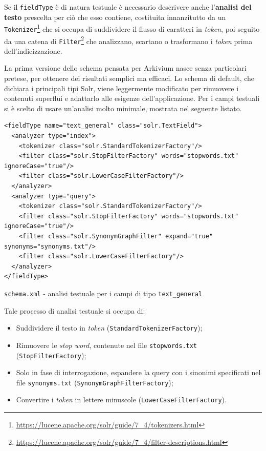 Se il \texttt{fieldType} è di natura testuale è necessario descrivere anche l’\textbf{analisi del testo} prescelta per ciò che esso contiene, costituita innanzitutto da un \texttt{Tokenizer}\footnote{\url{https://lucene.apache.org/solr/guide/7\_4/tokenizers.html}} che si occupa di suddividere il flusso di caratteri in \textit{token}, poi seguito da una catena di \texttt{Filter}\footnote{\url{https://lucene.apache.org/solr/guide/7\_4/filter-descriptions.html}} che analizzano, scartano o trasformano i \textit{token} prima dell’indicizzazione.

\vspace{2em}

La prima versione dello schema pensata per Arkivium nasce senza particolari pretese, per ottenere dei risultati semplici ma efficaci. Lo schema di default, che dichiara i principali tipi Solr, viene leggermente modificato per rimuovere i contenuti superflui e adattarlo alle esigenze dell’applicazione.
Per i campi testuali si è scelto di usare un’analisi molto minimale, mostrata nel seguente listato.

\begin{listing}[H]
\begin{verbatim}
<fieldType name="text_general" class="solr.TextField">
  <analyzer type="index">
    <tokenizer class="solr.StandardTokenizerFactory"/>
    <filter class="solr.StopFilterFactory" words="stopwords.txt" ignoreCase="true"/>
    <filter class="solr.LowerCaseFilterFactory"/>
  </analyzer>
  <analyzer type="query">
    <tokenizer class="solr.StandardTokenizerFactory"/>
    <filter class="solr.StopFilterFactory" words="stopwords.txt" ignoreCase="true"/>
    <filter class="solr.SynonymGraphFilter" expand="true" synonyms="synonyms.txt"/>
    <filter class="solr.LowerCaseFilterFactory"/>
  </analyzer>
</fieldType>
\end{verbatim}
\caption{\texttt{schema.xml} - analisi testuale per i campi di tipo \texttt{text\_general}}
\label{code:schema1texttype}
\end{listing}

\pagebreak
\noindent Tale processo di analisi testuale si occupa di:
\begin{itemize}
\item Suddividere il testo in \textit{token} (\texttt{StandardTokenizerFactory});
\item Rimuovere le \textit{stop word}, contenute nel file \texttt{stopwords.txt} (\texttt{StopFilterFactory});
\item Solo in fase di interrogazione, espandere la query con i sinonimi specificati nel file \texttt{synonyms.txt} (\texttt{SynonymGraphFilterFactory});
\item Convertire i \textit{token} in lettere minuscole (\texttt{LowerCaseFilterFactory}).
\end{itemize}

